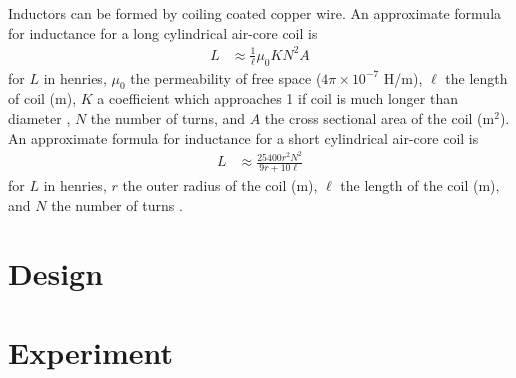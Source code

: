 \documentclass[letterpaper, 10 pt, conference]{ieeeconf}
\begin{document}
Inductors can be formed by coiling coated copper wire.  An approximate formula for inductance for a long cylindrical air-core coil is
  \begin{align}
 \label{eq:longaircoild}
L &\approx \frac{1}{\ell} \mu_0 K N^2 A
 \end{align}
 for $L$ in henries, $\mu_0$ the permeability of free space ($4\pi\times 10^{-7}$ H/m), $\ell$ the length of coil (m), $K$ a coefficient which approaches 1 if coil is much longer than diameter
 \cite{Nagaoka, Hantaro (1909-05-06). The Inductance Coefficients of Solenoids 27. Journal of the College of Science, Imperial University, Tokyo, Japan. p. 18. Retrieved 2011-11-10.},  $N$ the number of turns, and $A$ the cross sectional area of the coil (m$^2$).
 An approximate formula for inductance for a short cylindrical air-core coil is
  \begin{align}
 \label{eq:shortaircoil}
L &\approx \frac{ 25400 r^2 N^2}{9 r +10 \ell}
 \end{align}
 for $L$ in henries, $r$ the outer radius of the coil (m), $\ell$ the length of the coil (m), and $N$ the number of turns \cite{ARRL Handbook, 66th Ed. American Radio Relay League (1989).}.
 
 
 
 
\section{Design}
    
        
     
    
\section{Experiment}\label{sec:Experiment}
       
   

\end{document}
